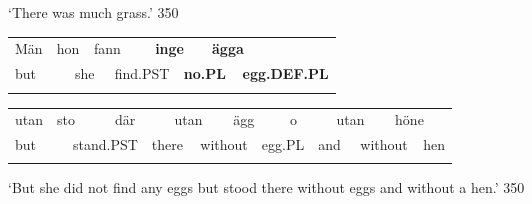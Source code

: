 \begin{styleTranslation}
‘There was much grass.’ 350

\end{styleTranslation}

\begin{tabular}{llllllllll}
\lsptoprule
Män & \multicolumn{2}{l}{hon

} & \multicolumn{2}{l}{fann

} & \multicolumn{2}{l}{{\bfseries inge}

} & \multicolumn{2}{l}{{\bfseries ägga}

} & \\
\multicolumn{2}{l}{but

} & \multicolumn{2}{l}{she

} & \multicolumn{2}{l}{find.PST

} & \multicolumn{2}{l}{{\bfseries no.PL}

} & \multicolumn{2}{l}{{\bfseries egg.DEF.PL}

}\\
\lspbottomrule
\end{tabular}

\begin{tabular}{llllllllllllllll}
\lsptoprule
utan & \multicolumn{2}{l}{sto

} & \multicolumn{2}{l}{där

} & \multicolumn{2}{l}{utan

} & \multicolumn{2}{l}{ägg

} & \multicolumn{2}{l}{o

} & \multicolumn{2}{l}{utan

} & \multicolumn{2}{l}{höne

} & \\
\multicolumn{2}{l}{but

} & \multicolumn{2}{l}{stand.PST

} & \multicolumn{2}{l}{there

} & \multicolumn{2}{l}{without

} & \multicolumn{2}{l}{egg.PL

} & \multicolumn{2}{l}{and

} & \multicolumn{2}{l}{without

} & \multicolumn{2}{l}{hen

}\\
\lspbottomrule
\end{tabular}

\begin{styleTranslation}
‘But she did not find any eggs but stood there without eggs and without a hen.’ 350

\end{styleTranslation}

